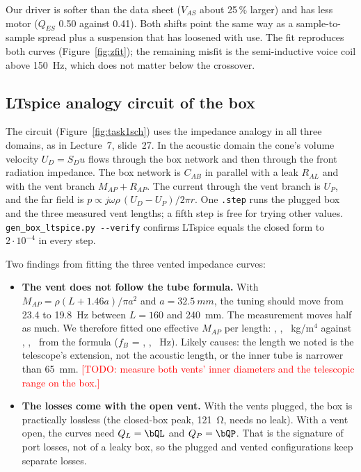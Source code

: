 \documentclass[a4paper,10pt]{article}
\newcommand{\file}[1]{\nolinkurl{#1}}
\newcommand{\todo}[1]{\textcolor{red}{[TODO: #1]}}
\begin{document}
Our driver is softer than the data sheet ($V_{AS}$ about 25\,\% larger) and has less motor
($Q_{ES}$ 0.50 against 0.41). Both shifts point the same way as a sample-to-sample spread plus a
suspension that has loosened with use. The fit reproduces both curves (Figure~\ref{fig:zfit});
the remaining misfit is the semi-inductive voice coil above \SI{150}{Hz}, which does not matter
below the crossover.

\subsection{LTspice analogy circuit of the box}
The circuit (Figure~\ref{fig:task1sch}) uses the impedance analogy in all three domains, as in
Lecture~7, slide~27. In the acoustic domain the cone's volume velocity $U_D = S_D u$ flows through the
box network and then through the front radiation impedance. The box network is $C_{AB}$ in parallel
with a leak $R_{AL}$ and with the vent branch $M_{AP} + R_{AP}$. The current through the vent branch is
$U_P$, and the far field is $p \propto j\omega\rho\,(U_D - U_P)/2\pi r$. One \file{.step} runs the
plugged box and the three measured vent lengths; a fifth step is free for trying other values.
\file{gen_box_ltspice.py --verify} confirms LTspice equals the closed form to $2\cdot10^{-4}$ in every step.

Two findings from fitting the three vented impedance curves:
\begin{itemize}
\item \textbf{The vent does not follow the tube formula.} With $M_{AP} = \rho(L + 1.46a)/\pi a^2$ and
  $a = \SI{32.5}{mm}$, the tuning should move from 23.4 to \SI{19.8}{Hz} between $L = 160$ and \SI{240}{mm}.
  The measurement moves half as much. We therefore fitted one effective $M_{AP}$ per length:
  \bMAPA, \bMAPB, \bMAPC~kg/m$^4$ against \bMAPformulaA, \bMAPformulaB, \bMAPformulaC\ from the
  formula ($f_B$ = \bfBA, \bfBB, \bfBC~Hz). Likely causes: the length we noted is the telescope's
  extension, not the acoustic length, or the inner tube is narrower than \SI{65}{mm}. \todo{measure
  both vents' inner diameters and the telescopic range on the box.}
\item \textbf{The losses come with the open vent.} With the vents plugged, the box is practically
  lossless (the closed-box peak, \SI{121}{\ohm}, needs no leak). With a vent open, the curves need
  $Q_L = \bQL$ and $Q_P = \bQP$. That is the signature of port losses, not of a leaky box, so the
  plugged and vented configurations keep separate losses.
\end{itemize}
\end{document}
